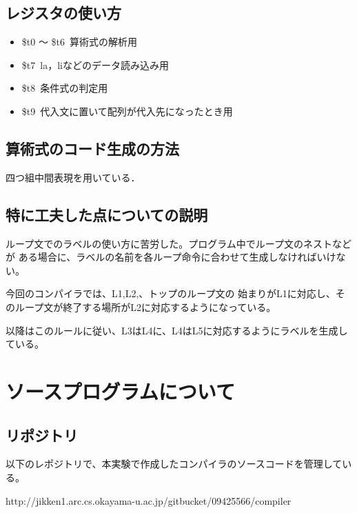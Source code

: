 \documentclass[11pt,a4j]{jarticle}
\begin{document}


\subsection{レジスタの使い方}


\begin{itemize}
  \item \$t0 ～ \$t6~算術式の解析用
  \item \$t7~la，liなどのデータ読み込み用
  \item \$t8~条件式の判定用
  \item \$t9~代入文に置いて配列が代入先になったとき用
\end{itemize}

\subsection{算術式のコード生成の方法}

四つ組中間表現を用いている．


\subsection{特に工夫した点についての説明}

ループ文でのラベルの使い方に苦労した。プログラム中でループ文のネストなどが
ある場合に、ラベルの名前を各ループ命令に合わせて生成しなければいけない。

今回のコンパイラでは、L1,L2,、トップのループ文の
始まりがL1に対応し、そのループ文が終了する場所がL2に対応するようになっている。

以降はこのルールに従い、L3はL4に、L4はL5に対応するようにラベルを生成している。




\section{ソースプログラムについて}

\subsection{リポジトリ}

以下のレポジトリで、本実験で作成したコンパイラのソースコードを管理している。

http://jikken1.arc.cs.okayama-u.ac.jp/gitbucket/09425566/compiler
\end{document}
